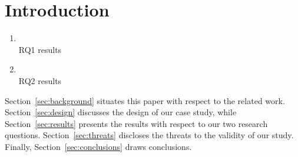 \section{Introduction}


\cite{Tantithamthavorn}

\begin{enumerate}[{\bf (RQ1)}]
\item {\bf \rqi}\\
RQ1 results

\item {\bf \rqii}\\
RQ2 results

\end{enumerate}

Section~\ref{sec:background} situates this paper with respect to the related work.
Section~\ref{sec:design} discusses the design of our case study, while Section~\ref{sec:results} presents the results with respect to our two research questions.
Section~\ref{sec:threats} discloses the threats to the validity of our study.
Finally, Section~\ref{sec:conclusions} draws conclusions.

